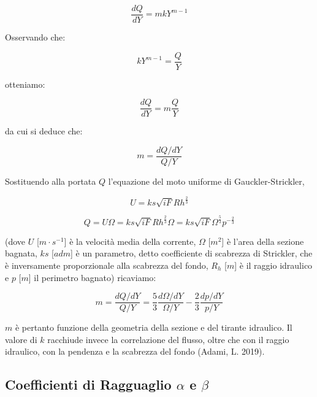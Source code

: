 \documentclass[12pt]{article} %
\begin{document}
\begin{equation}
    \frac{dQ}{dY}=mkY^{m-1}
    \label{eqn:m_1}
\end{equation}

\noindent Osservando che:

\begin{equation}
   kY^{m-1}=\frac{Q}{Y}
   \label{eqn:m_2}
\end{equation}

\noindent otteniamo:

\begin{equation}
    \frac{dQ}{dY}=m\frac{Q}{Y}
    \label{eqn:m_3}
\end{equation}

\noindent da cui si deduce che:

\begin{equation}
    m=\frac{dQ/dY}{Q/Y}
    \label{eqn:m_4}
\end{equation}

\noindent Sostituendo alla portata $Q$ l’equazione del moto uniforme di Gauckler-Strickler,
  
\begin{equation}
    U=ks\sqrt{iF}Rh^{\frac{2}{3}}
    \label{eqn:U_Gauckler-Strickler}
\end{equation}  
  
\begin{equation}
    Q=U\Omega=ks\sqrt{iF}Rh^{\frac{2}{3}}\Omega=ks\sqrt{iF}\Omega^{\frac{5}{3}}p^{-\frac{2}{3}}
    \label{eqn:Q_Gauckler-Strickler}
\end{equation}

\noindent (dove $U$ [$m\cdot s^{-1}$] è la velocità media della corrente, $\Omega$ [$m^2$] è l’area della sezione bagnata, $ks$ [$adm$] è un parametro, detto coefficiente di scabrezza di Strickler, che è inversamente proporzionale alla scabrezza del fondo, $R_h$ [$m$] è il raggio idraulico e $p$ [$m$] il perimetro bagnato) ricaviamo:

\begin{equation}
   m=\frac{dQ/dY}{Q/Y}=\frac{5}{3}\frac{d\Omega/dY}{\Omega/Y}-\frac{2}{3}\frac{dp/dY}{p/Y}
   \label{eqn:m_5}
\end{equation}

\noindent $m$ è pertanto funzione della geometria della sezione e del tirante idraulico. 
Il valore di $k$ racchiude invece la correlazione del flusso, oltre che con il raggio idraulico, con la pendenza e la scabrezza del fondo (Adami, L. 2019).

\subsection{\texorpdfstring{Coefficienti di Ragguaglio $\alpha$ e $\beta$}{} }
\end{document}
